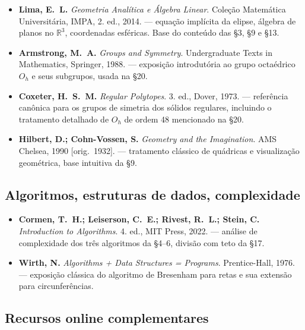 \documentclass[12pt,a4paper]{scrartcl}
\begin{document}
\begin{itemize}[leftmargin=1.4em,itemsep=0.3em,topsep=0.3em]
  \item \textbf{Lima, E.~L.} \emph{Geometria Analítica e Álgebra Linear}. Coleção
        Matemática Universitária, IMPA, 2.\textordmasculine{} ed., 2014.
        --- equação implícita da elipse, álgebra de planos no $\mathbb{R}^3$,
        coordenadas esféricas. Base do conteúdo das §3, §9 e §13.

  \item \textbf{Armstrong, M.~A.} \emph{Groups and Symmetry}. Undergraduate Texts in
        Mathematics, Springer, 1988.
        --- exposição introdutória ao grupo octaédrico $O_h$ e seus subgrupos, usada na §20.

  \item \textbf{Coxeter, H.~S.~M.} \emph{Regular Polytopes}. 3.\textordmasculine{} ed., Dover, 1973.
        --- referência canônica para os grupos de simetria dos sólidos regulares, incluindo o tratamento detalhado de $O_h$ de ordem 48 mencionado na §20.

  \item \textbf{Hilbert, D.; Cohn-Vossen, S.} \emph{Geometry and the Imagination}.
        AMS Chelsea, 1990 [orig.~1932].
        --- tratamento clássico de quádricas e visualização geométrica, base intuitiva da §9.
\end{itemize}

\subsection*{Algoritmos, estruturas de dados, complexidade}

\begin{itemize}[leftmargin=1.4em,itemsep=0.3em,topsep=0.3em]
  \item \textbf{Cormen, T.~H.; Leiserson, C.~E.; Rivest, R.~L.; Stein, C.}
        \emph{Introduction to Algorithms}. 4.\textordmasculine{} ed., MIT Press, 2022.
        --- análise de complexidade dos três algoritmos da §4--6, divisão com teto da §17.

  \item \textbf{Wirth, N.} \emph{Algorithms + Data Structures = Programs}.
        Prentice-Hall, 1976.
        --- exposição clássica do algoritmo de Bresenham para retas e sua extensão para circunferências.
\end{itemize}

\subsection*{Recursos online complementares}
\end{document}
